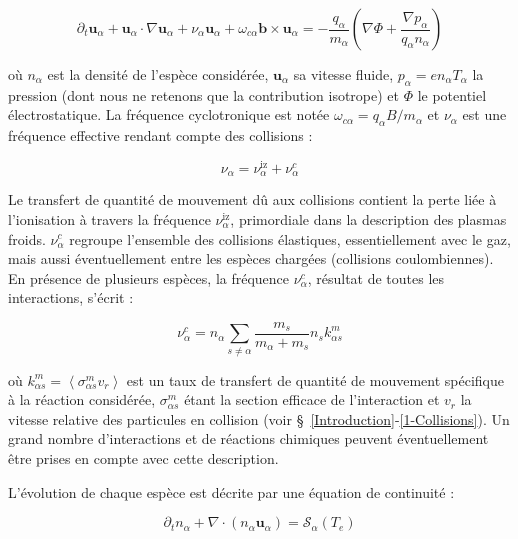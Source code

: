 \begin{refsection}
\begin{equation}
\label{3-eqMouvement}
\partial_t \mathbf{u}_\alpha + \mathbf{u}_\alpha\cdot\nabla\mathbf{u}_\alpha+
\nu_\alpha\mathbf{u}_\alpha+\omega_{c\alpha}\mathbf{b}\times\mathbf{u}_\alpha=
-\frac{q_\alpha}{m_\alpha}\left(\nabla \Phi+\frac{\nabla
p_\alpha}{q_\alpha n_\alpha}\right)
\end{equation}

où $n_\alpha$ est la densité de l'espèce considérée, $\mathbf{u}_\alpha$ sa
vitesse fluide, $p_\alpha =en_\alpha T_\alpha$ la pression (dont nous ne
retenons que la contribution isotrope) et $\Phi$ le potentiel électrostatique. La fréquence
cyclotronique est notée $\omega_{c\alpha}=q_\alpha B/m_\alpha$ et $\nu_\alpha$
est une fréquence effective rendant compte des collisions :

\begin{equation}
\nu_\alpha=\nu_{\alpha}^\text{iz}+\nu_{\alpha}^{c}
\end{equation}

Le transfert de quantité de mouvement dû aux collisions contient la perte liée à
l'ionisation à travers la fréquence $\nu_{\alpha}^\text{iz}$, primordiale dans
la description des plasmas froids. $\nu_{\alpha}^{c}$ regroupe l'ensemble des
collisions élastiques, essentiellement avec le gaz, mais aussi éventuellement
entre les espèces chargées (collisions coulombiennes). En présence de plusieurs espèces, la
fréquence $\nu_{\alpha}^{c}$, résultat de toutes les interactions, s'écrit :

\begin{equation}
\nu_{\alpha}^c=n_\alpha\sum_{s\neq\alpha} \frac{m_s}{m_\alpha+m_s}
n_sk^m_{\alpha s}
\end{equation}

où $k^m_{\alpha
s}=\left<\sigma^m_{\alpha s}v_r\right>$ est un taux de transfert de quantité de
mouvement spécifique à la réaction considérée, $\sigma^m_{\alpha s}$ étant la
section efficace de l'interaction et $v_r$ la vitesse relative des particules en
collision (voir \S~\ref{Introduction}-\ref{1-Collisions}). Un grand nombre
d'interactions et de réactions chimiques peuvent éventuellement être prises en compte avec cette description.

L'évolution de chaque espèce est décrite par une équation de continuité :

\begin{equation}
\label{3-continuite}
\partial_t n_\alpha +
\nabla\cdot\left(n_\alpha\mathbf{u}_\alpha\right)=\mathcal{S}_\alpha(T_e)
\end{equation}


\end{refsection}
